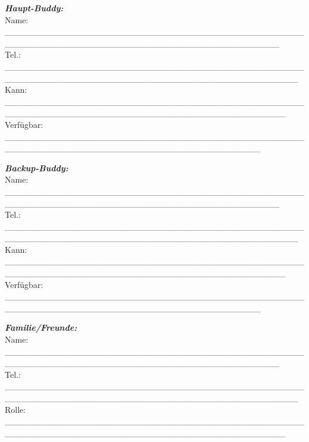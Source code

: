 \emph{\textbf{Haupt-Buddy:}}\\
Name: \_\_\_\_\_\_\_\_\_\_\_\_\_\_\_\_\_\_\_\_\_\_\_\_\_\_\_\_\_\_\_\_\_\_\_\_\_\_\_\_\_\_\_\_\_\_\_\_\_\_\_\_\_\_\_\_\_\_\_\_\_\_\_\_\_\_\_\_\_\_\_\_\_\_\_\_\_\_\_\_\_\_\_\_\_\_\_\_\_\_\_\_\\
Tel.: \_\_\_\_\_\_\_\_\_\_\_\_\_\_\_\_\_\_\_\_\_\_\_\_\_\_\_\_\_\_\_\_\_\_\_\_\_\_\_\_\_\_\_\_\_\_\_\_\_\_\_\_\_\_\_\_\_\_\_\_\_\_\_\_\_\_\_\_\_\_\_\_\_\_\_\_\_\_\_\_\_\_\_\_\_\_\_\_\_\_\_\_\_\_\_\\
Kann: \_\_\_\_\_\_\_\_\_\_\_\_\_\_\_\_\_\_\_\_\_\_\_\_\_\_\_\_\_\_\_\_\_\_\_\_\_\_\_\_\_\_\_\_\_\_\_\_\_\_\_\_\_\_\_\_\_\_\_\_\_\_\_\_\_\_\_\_\_\_\_\_\_\_\_\_\_\_\_\_\_\_\_\_\_\_\_\_\_\_\_\_\_\\
Verfügbar: \_\_\_\_\_\_\_\_\_\_\_\_\_\_\_\_\_\_\_\_\_\_\_\_\_\_\_\_\_\_\_\_\_\_\_\_\_\_\_\_\_\_\_\_\_\_\_\_\_\_\_\_\_\_\_\_\_\_\_\_\_\_\_\_\_\_\_\_\_\_\_\_\_\_\_\_\_\_\_\_\_\_\_\_\_\_\_\_\_

\emph{\textbf{Backup-Buddy:}}\\
Name: \_\_\_\_\_\_\_\_\_\_\_\_\_\_\_\_\_\_\_\_\_\_\_\_\_\_\_\_\_\_\_\_\_\_\_\_\_\_\_\_\_\_\_\_\_\_\_\_\_\_\_\_\_\_\_\_\_\_\_\_\_\_\_\_\_\_\_\_\_\_\_\_\_\_\_\_\_\_\_\_\_\_\_\_\_\_\_\_\_\_\_\_\\
Tel.: \_\_\_\_\_\_\_\_\_\_\_\_\_\_\_\_\_\_\_\_\_\_\_\_\_\_\_\_\_\_\_\_\_\_\_\_\_\_\_\_\_\_\_\_\_\_\_\_\_\_\_\_\_\_\_\_\_\_\_\_\_\_\_\_\_\_\_\_\_\_\_\_\_\_\_\_\_\_\_\_\_\_\_\_\_\_\_\_\_\_\_\_\_\_\_\\
Kann: \_\_\_\_\_\_\_\_\_\_\_\_\_\_\_\_\_\_\_\_\_\_\_\_\_\_\_\_\_\_\_\_\_\_\_\_\_\_\_\_\_\_\_\_\_\_\_\_\_\_\_\_\_\_\_\_\_\_\_\_\_\_\_\_\_\_\_\_\_\_\_\_\_\_\_\_\_\_\_\_\_\_\_\_\_\_\_\_\_\_\_\_\_\\
Verfügbar: \_\_\_\_\_\_\_\_\_\_\_\_\_\_\_\_\_\_\_\_\_\_\_\_\_\_\_\_\_\_\_\_\_\_\_\_\_\_\_\_\_\_\_\_\_\_\_\_\_\_\_\_\_\_\_\_\_\_\_\_\_\_\_\_\_\_\_\_\_\_\_\_\_\_\_\_\_\_\_\_\_\_\_\_\_\_\_\_\_

\emph{\textbf{Familie/Freunde:}}\\
Name: \_\_\_\_\_\_\_\_\_\_\_\_\_\_\_\_\_\_\_\_\_\_\_\_\_\_\_\_\_\_\_\_\_\_\_\_\_\_\_\_\_\_\_\_\_\_\_\_\_\_\_\_\_\_\_\_\_\_\_\_\_\_\_\_\_\_\_\_\_\_\_\_\_\_\_\_\_\_\_\_\_\_\_\_\_\_\_\_\_\_\_\_\\
Tel.: \_\_\_\_\_\_\_\_\_\_\_\_\_\_\_\_\_\_\_\_\_\_\_\_\_\_\_\_\_\_\_\_\_\_\_\_\_\_\_\_\_\_\_\_\_\_\_\_\_\_\_\_\_\_\_\_\_\_\_\_\_\_\_\_\_\_\_\_\_\_\_\_\_\_\_\_\_\_\_\_\_\_\_\_\_\_\_\_\_\_\_\_\_\_\_\\
Rolle: \_\_\_\_\_\_\_\_\_\_\_\_\_\_\_\_\_\_\_\_\_\_\_\_\_\_\_\_\_\_\_\_\_\_\_\_\_\_\_\_\_\_\_\_\_\_\_\_\_\_\_\_\_\_\_\_\_\_\_\_\_\_\_\_\_\_\_\_\_\_\_\_\_\_\_\_\_\_\_\_\_\_\_\_\_\_\_\_\_\_\_\_\_

